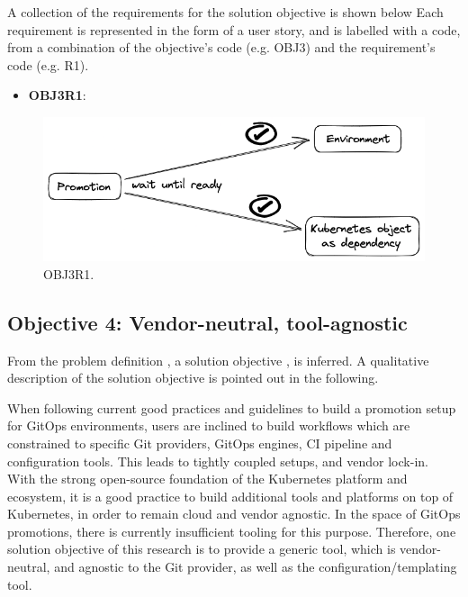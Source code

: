 A collection of the requirements for the solution objective is shown below
Each requirement is represented in the form of a user story,
and is labelled with a code, from a combination of the
objective's code (e.g. OBJ3) and the requirement's code (e.g. R1).

\begin{itemize}
	\item \textbf{OBJ3R1}: 
\end{itemize}

\begin{figure}[h]
	\centering
	\includegraphics[width=0.82\linewidth]{assets/OBJ3R1.png}
	\caption{OBJ3R1.
	}
	\label{fig:OBJ3R1}	
\end{figure}

\subsection{Objective 4: Vendor-neutral, tool-agnostic}
\label{objective4}

From the problem definition
\textbf{},
a solution objective
\textbf{},
is inferred.
A qualitative description of the solution objective
is pointed out in the following.

When following current good practices and guidelines
to build a promotion setup for GitOps environments,
users are inclined to build workflows which are constrained to specific Git providers, GitOps engines,
CI pipeline and configuration tools. This leads to tightly coupled setups,
and vendor lock-in.
With the strong open-source foundation of the Kubernetes platform and ecosystem,
it is a good practice to build additional tools and platforms on top of Kubernetes,
in order to remain cloud and vendor agnostic. In the space of GitOps promotions,
there is currently insufficient tooling for this purpose.
Therefore, one solution objective of this research is to
provide a generic tool,
which is vendor-neutral,
and agnostic to the Git provider, as well as the configuration/templating tool.

